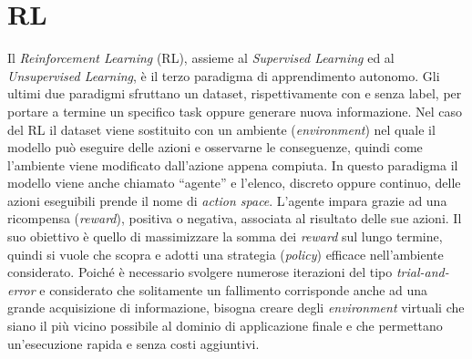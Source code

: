 

\section{RL}
Il \emph{Reinforcement Learning} (RL), assieme al \emph{Supervised Learning} ed al \emph{Unsupervised Learning}, è il terzo paradigma di apprendimento autonomo.
Gli ultimi due paradigmi sfruttano un dataset, rispettivamente con e senza label, per portare a termine un specifico task oppure generare nuova informazione.
Nel caso del RL il dataset viene sostituito con un ambiente (\emph{environment}) nel quale il modello può eseguire delle azioni e osservarne le conseguenze, quindi come l'ambiente viene modificato dall'azione appena compiuta.
In questo paradigma il modello viene anche chiamato ``agente'' e l'elenco, discreto oppure continuo, delle azioni eseguibili prende il nome di \emph{action space}.
L'agente impara grazie ad una ricompensa (\emph{reward}), positiva o negativa, associata al risultato delle sue azioni.
Il suo obiettivo è quello di massimizzare la somma dei \emph{reward} sul lungo termine, quindi si vuole che scopra e adotti una strategia (\emph{policy}) efficace nell'ambiente considerato.
Poiché è necessario svolgere numerose iterazioni del tipo \emph{trial-and-error} e considerato che solitamente un fallimento corrisponde anche ad una grande acquisizione di informazione, bisogna creare degli \emph{environment} virtuali che siano il più vicino possibile al dominio di applicazione finale e che permettano un'esecuzione rapida e senza costi aggiuntivi.
%

